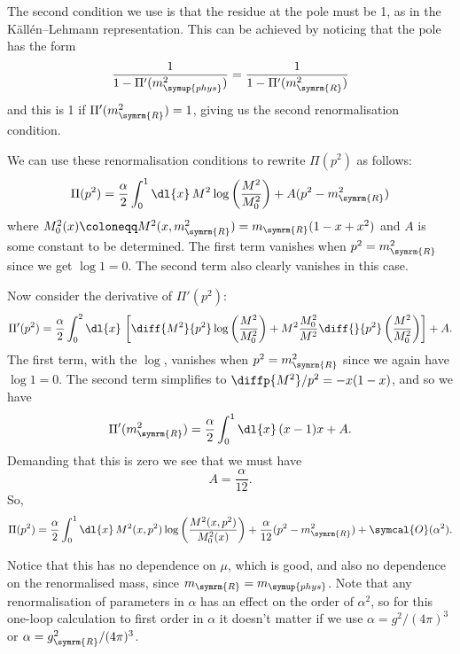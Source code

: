 \documentclass[fleqn]{NotesClass}
\newcommand{\order}{\symcal{O}}
\newcommand{\phys}{\symup{phys}}
\newcommand{\renormalised}{\symrm{R}}
\begin{document}
    The second condition we use is that the residue at the pole must be 1, as in the K\"all\'en--Lehmann representation.
    This can be achieved by noticing that the pole has the form
    \begin{equation}
        \frac{1}{1 - \Pi'(m_{\phys}^2)} = \frac{1}{1 - \Pi'(m_{\renormalised}^2)}
    \end{equation}
    and this is 1 if \(\Pi'(m_{\renormalised}^2) = 1\), giving us the second renormalisation condition.
    
    We can use these renormalisation conditions to rewrite \(\Pi(p^2)\) as follows:
    \begin{equation}
        \Pi(p^2) = \frac{\alpha}{2} \int_0^1 \dl{x} \, M^2 \log\left( \frac{M^2}{M_0^2} \right) + A(p^2 - m_{\renormalised}^2)
    \end{equation}
    where \(M_0^2(x) \coloneqq M^2(x, m_{\renormalised}^2) = m_{\renormalised}(1 - x + x^2)\) and \(A\) is some constant to be determined.
    The first term vanishes when \(p^2 = m_{\renormalised}^2\) since we get \(\log 1 = 0\).
    The second term also clearly vanishes in this case.
    
    Now consider the derivative of \(\Pi'(p^2)\):
    \begin{align}
        \Pi'(p^2) = \frac{\alpha}{2} \int_0^2 \dl{x} \, \left[ \diff{M^2}{p^2} \log\left( \frac{M^2}{M_0^2} \right) + M^2 \frac{M_0^2}{M^2} \diff{}{p^2} \left( \frac{M^2}{M_0^2} \right) \right] + A.
    \end{align}
    The first term, with the \(\log\), vanishes when \(p^2 = m_{\renormalised}^2\) since we again have \(\log 1 = 0\).
    The second term simplifies to \(\diffp{M^2}/{p^2} = -x(1 - x)\), and so we have
    \begin{equation}
        \Pi'(m_{\renormalised}^2) = \frac{\alpha}{2} \int_0^1 \dl{x} \, (x - 1)x + A.
    \end{equation}
    Demanding that this is zero we see that we must have
    \begin{equation}
        A = \frac{\alpha}{12}.
    \end{equation}
    So, 
    \begin{equation}
        \Pi(p^2) = \frac{\alpha}{2} \int_0^1 \dl{x} \, M^2(x, p^2) \log\left( \frac{M^2(x, p^2)}{M_0^2(x)} \right) + \frac{\alpha}{12}(p^2 - m_{\renormalised}^2) + \order(\alpha^2).
    \end{equation}
    
    Notice that this has no dependence on \(\mu\), which is good, and also no dependence on the renormalised mass, since \(m_{\renormalised} = m_{\phys}\).
    Note that any renormalisation of parameters in \(\alpha\) has an effect on the order of \(\alpha^2\), so for this one-loop calculation to first order in \(\alpha\) it doesn't matter if we use \(\alpha = g^2/(4\pi)^3\) or \(\alpha = g_{\renormalised}^2/(4\pi)^3\).
   
\end{document}
